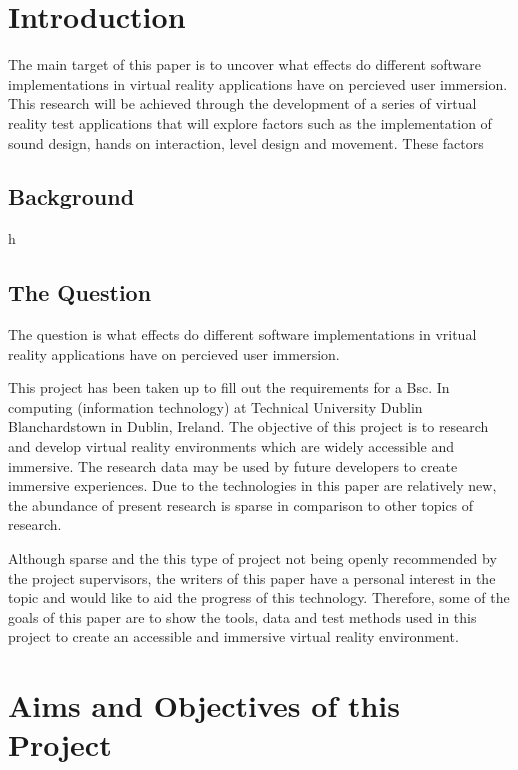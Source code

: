 \chapter{Introduction}
The main target of this paper is to uncover what effects do different software implementations in virtual reality applications have on percieved user immersion. This research will be achieved through the development of a series of virtual reality test applications that will explore factors such as the implementation of sound design, hands on interaction, level design and movement.
These factors

\section{Background}
h
\section{The Question}
The question is what effects do different software implementations in vritual reality applications have on percieved user immersion. 



This project has been taken up to fill out the requirements for a Bsc. In computing (information technology) at Technical University Dublin Blanchardstown in Dublin, Ireland. The objective of this project is to research and develop virtual reality environments which are widely accessible and immersive. The research data may be used by future developers to create immersive experiences.  
Due to the technologies in this paper are relatively new, the abundance of present research is sparse in comparison to other topics of research. 

Although sparse and the this type of project not being openly recommended by the project supervisors, the writers of this paper have a personal interest in the topic and would like to aid the progress of this technology.  Therefore, some of the goals of this paper are to show the tools, data and test methods used in this project to create an accessible and immersive virtual reality environment. 


\chapter{Aims and Objectives of this Project}

